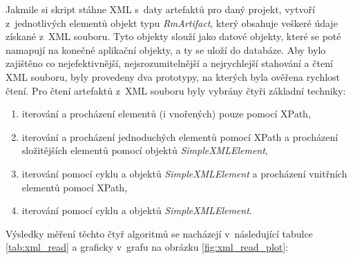 \documentclass[czech,master]{diploma}
\begin{document}
Jakmile si skript stáhne XML s~daty artefaktů pro daný projekt, vytvoří z~jednotlivých elementů objekt typu \textit{RmArtifact}, který obsahuje veškeré údaje získané z~XML souboru. Tyto objekty slouží jako datové objekty, které se poté namapují na konečné aplikační objekty, a ty se uloží do databáze. Aby bylo zajištěno co nejefektivnější, nejsrozumitelnější a nejrychlejší stahování a čtení XML souboru, byly provedeny dva prototypy, na kterých byla ověřena rychlost čtení. Pro čtení artefaktů z~XML souboru byly vybrány čtyři základní techniky:

\begin{enumerate}
\item iterování a procházení elementů (i vnořených) pouze pomocí XPath,
\item iterování a procházení jednoduchých elementů pomocí XPath a procházení složitějších elementů pomocí objektů \textit{SimpleXMLElement},
\item iterování pomocí cyklu a objektů \textit{SimpleXMLElement} a procházení vnitřních elementů pomocí XPath,
\item iterování pomocí cyklu a objektů \textit{SimpleXMLElement}.
\end{enumerate}

Výsledky měření těchto čtyř algoritmů se nacházejí v~následující tabulce \ref{tab:xml_read} a graficky v~grafu na obrázku \ref{fig:xml_read_plot}:
\end{document}
